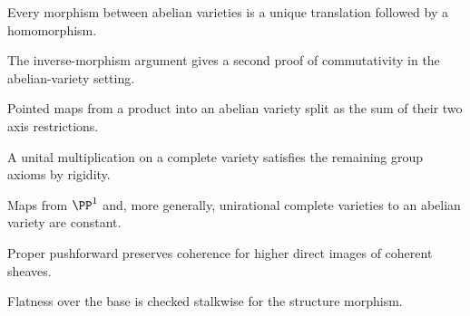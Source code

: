 \begin{remark}
\label{ch02-sec04-morphism-translation}
Every morphism between abelian varieties is a unique translation followed by a
homomorphism.
\notready
\end{remark}

\begin{remark}
\label{ch02-sec04-commutativity-second-proof}
The inverse-morphism argument gives a second proof of commutativity in the
abelian-variety setting.
\notready
\end{remark}

\begin{remark}
\label{ch02-sec04-hom-linearity}
Pointed maps from a product into an abelian variety split as the sum of their
two axis restrictions.
\notready
\end{remark}

\begin{remark}
\label{ch02-sec04-unital-law}
A unital multiplication on a complete variety satisfies the remaining group
axioms by rigidity.
\notready
\end{remark}

\begin{remark}
\label{ch02-sec04-no-rational-curves}
Maps from $\PP^1$ and, more generally, unirational complete varieties to an
abelian variety are constant.
\notready
\end{remark}

\begin{remark}
\label{ch02-sec05-proper-direct-image}
Proper pushforward preserves coherence for higher direct images of coherent
sheaves.
\notready
\end{remark}

\begin{remark}
\label{ch02-sec05-flatness}
Flatness over the base is checked stalkwise for the structure morphism.
\notready
\end{remark}

